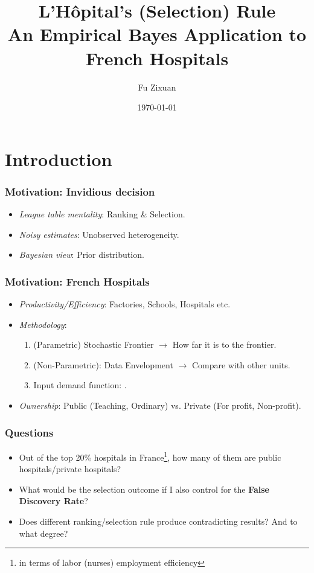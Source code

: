 \documentclass[10pt,mathserif,aspectratio=169]{beamer}
\title{\large \bfseries L'Hôpital's (Selection) Rule\\
  An Empirical Bayes Application to French Hospitals}
\author{Fu Zixuan\\[3ex]
}
\date{\today}
\begin{document}
\frame{
  \thispagestyle{empty}
  \titlepage
}

\section{Introduction}

\begin{frame}
  \frametitle{Motivation: Invidious decision}
  \begin{itemize}\itemsep=12pt
    \item \textit{League table mentality}: Ranking \& Selection.\cite{gu2023invidious}
    \item \textit{Noisy estimates}: Unobserved heterogeneity. \cite{chetty2014measuring}
    \item \textit{Bayesian view}: Prior distribution.\cite{gu2017empirical}
  \end{itemize}
\end{frame}

\begin{frame}
  \frametitle{Motivation: French Hospitals}
  \begin{itemize}\itemsep=12pt
    \item \textit{Productivity/Efficiency}: Factories, Schools, Hospitals etc.
    \item \textit{Methodology}:
          \begin{enumerate} \vspace*{0.5em} \itemsep=8pt
            \item (Parametric) Stochastic Frontier \cite{aigner1977formulation,meeusen1977efficiency}$\to$ How far it is to the frontier.
            \item (Non-Parametric): Data Envelopment \cite{charnes1978measuring}$\to$ Compare with other units.
            \item Input demand function: \cite{croiset2024hospitals}.
          \end{enumerate}
    \item \textit{Ownership}: Public (Teaching, Ordinary) vs. Private (For profit, Non-profit).
  \end{itemize}
\end{frame}

\begin{frame}
  \frametitle{Questions}
  \begin{itemize}\itemsep=12pt
    \item Out of the top 20\% hospitals in France\footnote{in terms of labor (nurses)
            employment efficiency}, how many of them are public hospitals/private
          hospitals?
    \item What would be the selection outcome if I also control for the \textbf{False
            Discovery Rate}?
    \item Does different ranking/selection rule produce contradicting results? And to
          what degree?
  \end{itemize}
\end{frame}
\end{document}
